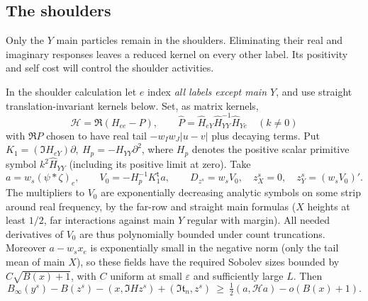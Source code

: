 \subsection{The shoulders}

Only the $Y$ main particles remain in the shoulders. Eliminating their
real and imaginary responses leaves a reduced kernel on every other
label. Its positivity and self cost will control the shoulder activities.

\begin{lemma}\label{lem:07_magnetic_analysis-shoulder}
In the shoulder calculation let \(e\) index \emph{all labels except main \(Y\)}, and use straight translation-invariant kernels below. Set, as matrix kernels,
\[
 \mathcal H=\Re(H_{ee}-P),\qquad
 \widehat P=\widehat H_{eY}\widehat H_{YY}^{-1}\widehat H_{Ye}
 \quad(k\ne0)
\]
with \(\Re P\) chosen to have real tail \(-w_Iw_J|u-v|\) plus decaying terms. Put \(K_1=(\Im H_{eY})\partial,\ H_p=-H_{YY}\partial^2\), where \(H_p\) denotes the positive scalar primitive symbol \(k^2\widehat H_{YY}\) (including its positive limit at zero). Take
\[
 a=w_s(\psi*\zeta)_e,\qquad
 V_0=-H_p^{-1}K_1^{\mathsf t} a,\qquad
 D_{z^s}=w_s V_0,\quad z^s_X=0,\quad z^s_Y=(w_s V_0)' .
\]
The multipliers to \(V_0\) are exponentially decreasing analytic symbols on some strip around real frequency, by the far-row and straight main formulas (\(X\) heights at least \(1/2\), far interactions against main \(Y\) regular with margin). All needed derivatives of \(V_0\) are thus polynomially bounded under count truncations. Moreover \(a-w_s x_e\) is exponentially small in the negative norm (only the tail mean of main \(X\)), so these fields have the required Sobolev sizes bounded by \(C\sqrt{B(x)+1}\), with \(C\) uniform at small \(\varepsilon\) and sufficiently large \(L\). Then
\begin{equation}
 B_\infty(y^s)-B(z^s)-(x,\Im H z^s)+(\Im\mathfrak t_n,z^s)
 \ \ge\ \tfrac12(a,\mathcal H a)-o(B(x)+1).
 \label{eq:M-27}
\end{equation}

\end{lemma}
